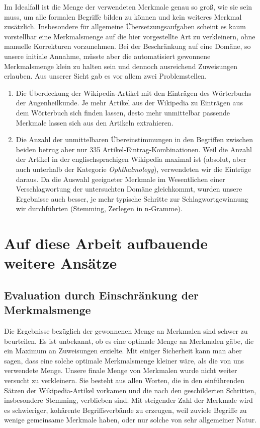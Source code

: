 \documentclass[pagesize,DIV=calc,12pt,draft]{scrreprt}
\begin{document}
Im Idealfall ist die Menge der verwendeten Merkmale genau so groß, wie sie sein muss, um alle formalen Begriffe bilden zu können und kein weiteres Merkmal zusätzlich. 
Insbesondere für allgemeine Übersetzungsaufgaben scheint es kaum vorstellbar eine Merkmalsmenge auf die hier vorgestellte Art zu verkleinern, ohne manuelle Korrekturen vorzunehmen. 
Bei der Beschränkung auf eine Domäne, so unsere initiale Annahme, müsste aber die automatisiert gewonnene Merkmalsmenge klein zu halten sein und dennoch ausreichend Zuweisungen erlauben. 
Aus unserer Sicht gab es vor allem zwei Problemstellen. 
\begin{enumerate}
\item Die Überdeckung der Wikipedia-Artikel mit den Einträgen des Wörterbuchs der Augenheilkunde. 
Je mehr Artikel aus der Wikipedia zu Einträgen aus dem Wörterbuch sich finden lassen, desto mehr unmittelbar passende Merkmale lassen sich aus den Artikeln extrahieren. 
\item Die Anzahl der unmittelbaren Übereinstimmungen in den Begriffen zwischen beiden betrug aber nur 335 Artikel-Eintrag-Kombinationen. 
Weil die Anzahl der Artikel in der englischsprachigen Wikipedia maximal ist (absolut, aber auch unterhalb der Kategorie \emph{Ophthalmology}), verwendeten wir die Einträge daraus. 
Da die Auswahl geeigneter Merkmale im Wesentlichen einer Verschlagwortung der untersuchten Domäne gleichkommt, wurden unsere Ergebnisse auch besser, je mehr typische Schritte zur Schlagwortgewinnung wir durchführten (Stemming, Zerlegen in n-Gramme). 
\end{enumerate}

\section{Auf diese Arbeit aufbauende weitere Ansätze}
\subsection{Evaluation durch Einschränkung der Merkmalsmenge}

Die Ergebnisse bezüglich der gewonnenen Menge an Merkmalen sind schwer zu beurteilen.
Es ist unbekannt, ob es eine optimale Menge an Merkmalen gäbe, die ein Maximum an Zuweisungen erzielte.
Mit einiger Sicherheit kann man aber sagen, dass eine solche optimale Merkmalsmenge kleiner wäre, als die von uns verwendete Menge.
Unsere finale Menge von Merkmalen wurde nicht weiter versucht zu verkleinern.
Sie besteht aus allen Worten, die in den einführenden Sätzen der Wikipedia-Artikel vorkamen und die nach den geschilderten Schritten, insbesondere Stemming, verblieben sind.
Mit steigender Zahl der Merkmale wird es schwieriger, kohärente Begriffsverbände zu erzeugen, weil zuviele Begriffe zu wenige gemeinsame Merkmale haben, oder nur solche von sehr allgemeiner Natur.
\end{document}
